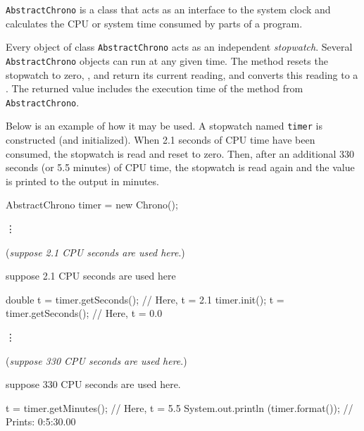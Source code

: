 
\texttt{AbstractChrono} is a class that acts as an interface to
the system clock and calculates the CPU or system time consumed by
parts of a program.

Every object of class \texttt{AbstractChrono} acts as an independent {\em stopwatch}.
Several \texttt{AbstractChrono} objects can run at any given time.
The method  resets the stopwatch to zero,
,  and 
 return its current reading,
and  converts this reading to a .
The returned value includes the execution time of the method
from \texttt{AbstractChrono}.

Below is an example of how it may be used.
A stopwatch named \texttt{timer} is constructed (and initialized).
When 2.1 seconds of CPU time have been consumed,
the stopwatch is read and reset to zero.
Then, after an additional 330 seconds (or 5.5 minutes) of CPU time,
the stopwatch is read again and the value is printed to the output
in minutes.
\begin{vcode}

AbstractChrono timer = new Chrono();
\end{vcode}
\begin{latexonly}
\begin{vcode}
    \vdots \end{vcode}
\vskip -15pt \hskip 0.8in ({\em suppose 2.1 CPU seconds are used here}.)
\end{latexonly}
\begin{htmlonly}
\begin{vcode}


   suppose 2.1 CPU seconds are used here

\end{vcode}
\end{htmlonly}
\begin{vcode}
double t = timer.getSeconds();               // Here, t = 2.1
timer.init();
t = timer.getSeconds();                      // Here, t = 0.0
\end{vcode}
\begin{latexonly}
\begin{vcode}    \vdots \end{vcode}
\vskip -15pt \hskip 0.8in ({\em suppose 330 CPU seconds are used here}.)
\end{latexonly}
\begin{htmlonly}
\begin{vcode}


   suppose 330 CPU seconds are used here.

\end{vcode}
\end{htmlonly}
\begin{vcode}
t = timer.getMinutes();                      // Here, t = 5.5
System.out.println (timer.format());         // Prints: 0:5:30.00
\end{vcode}


